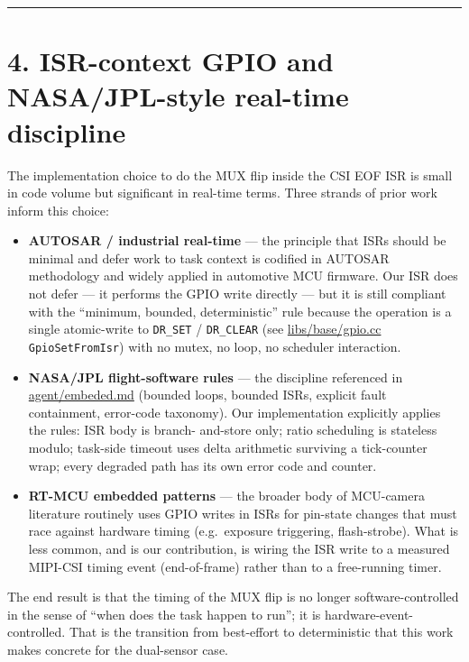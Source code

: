 \begin{center}\rule{0.5\linewidth}{0.5pt}\end{center}

\section{4. ISR-context GPIO and NASA/JPL-style real-time
discipline}\label{isr-context-gpio-and-nasajpl-style-real-time-discipline}

The implementation choice to do the MUX flip inside the CSI EOF ISR is
small in code volume but significant in real-time terms. Three strands
of prior work inform this choice:

\begin{itemize}
\tightlist
\item
  \textbf{AUTOSAR / industrial real-time} --- the principle that ISRs
  should be minimal and defer work to task context is codified in
  AUTOSAR methodology and widely applied in automotive MCU firmware. Our
  ISR does not defer --- it performs the GPIO write directly --- but it
  is still compliant with the ``minimum, bounded, deterministic'' rule
  because the operation is a single atomic-write to \texttt{DR\_SET} /
  \texttt{DR\_CLEAR} (see
  \href{../../../libs/base/gpio.cc}{libs/base/gpio.cc}
  \texttt{GpioSetFromIsr}) with no mutex, no loop, no scheduler
  interaction.
\item
  \textbf{NASA/JPL flight-software rules} --- the discipline referenced
  in \href{../agent/embeded.md}{agent/embeded.md} (bounded loops,
  bounded ISRs, explicit fault containment, error-code taxonomy). Our
  implementation explicitly applies the rules: ISR body is branch-
  and-store only; ratio scheduling is stateless modulo; task-side
  timeout uses delta arithmetic surviving a tick-counter wrap; every
  degraded path has its own error code and counter.
\item
  \textbf{RT-MCU embedded patterns} --- the broader body of MCU-camera
  literature routinely uses GPIO writes in ISRs for pin-state changes
  that must race against hardware timing (e.g.~exposure triggering,
  flash-strobe). What is less common, and is our contribution, is wiring
  the ISR write to a measured MIPI-CSI timing event (end-of-frame)
  rather than to a free-running timer.
\end{itemize}

The end result is that the timing of the MUX flip is no longer
software-controlled in the sense of ``when does the task happen to
run''; it is hardware-event-controlled. That is the transition from
best-effort to deterministic that this work makes concrete for the
dual-sensor case.

